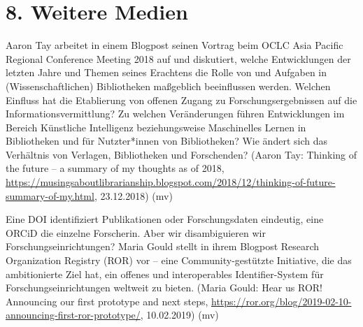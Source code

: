 \documentclass[a4paper,
fontsize=11pt,
oneside,
numbers=noperiodatend,
parskip=half-,
bibliography=totoc,
final
]{scrartcl}
\begin{document}
\hypertarget{weitere-medien}{%
\section{8. Weitere Medien}\label{weitere-medien}}

Aaron Tay arbeitet in einem Blogpost seinen Vortrag beim OCLC Asia
Pacific Regional Conference Meeting 2018 auf und diskutiert, welche
Entwicklungen der letzten Jahre und Themen seines Erachtens die Rolle
von und Aufgaben in (Wissenschaftlichen) Bibliotheken maßgeblich
beeinflussen werden. Welchen Einfluss hat die Etablierung von offenen
Zugang zu Forschungsergebnissen auf die Informationsvermittlung? Zu
welchen Veränderungen führen Entwicklungen im Bereich Künstliche
Intelligenz beziehungsweise Maschinelles Lernen in Bibliotheken und für
Nutzter*innen von Bibliotheken? Wie ändert sich das Verhältnis von
Verlagen, Bibliotheken und Forschenden? (Aaron Tay: Thinking of the
future -- a summary of my thoughts as of 2018,
\url{https://musingsaboutlibrarianship.blogspot.com/2018/12/thinking-of-future-summary-of-my.html},
23.12.2018) (mv)

Eine DOI identifiziert Publikationen oder Forschungsdaten eindeutig,
eine ORCiD die einzelne Forscherin. Aber wir disambiguieren wir
Forschungseinrichtungen? Maria Gould stellt in ihrem Blogpost Research
Organization Registry (ROR) vor -- eine Community-gestützte Initiative,
die das ambitionierte Ziel hat, ein offenes und interoperables
Identifier-System für Forschungseinrichtungen weltweit zu bieten. (Maria
Gould: Hear us ROR! Announcing our first prototype and next steps,
\url{https://ror.org/blog/2019-02-10-announcing-first-ror-prototype/},
10.02.2019) (mv)
\end{document}
